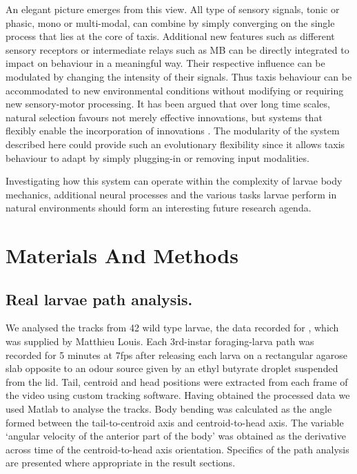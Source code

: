 \documentclass[11pt,a4paper]{article}
\begin{document}
An elegant picture emerges from this view. All type of sensory signals, tonic or phasic, mono or multi-modal, can combine by simply converging on the single process that lies at the core of taxis. Additional new features such as different sensory receptors or intermediate relays such as MB can be directly integrated to impact on behaviour in a meaningful way. Their respective influence can be modulated by changing the intensity of their signals. Thus taxis behaviour can be accommodated to new environmental conditions without modifying or requiring new sensory-motor processing. It has been argued that over long time scales, natural selection favours not merely effective innovations, but systems that flexibly enable the incorporation of innovations \citep{vermeij1973adaptation}. The modularity of the system described here could provide such an evolutionary flexibility since it allows taxis behaviour to adapt by simply plugging-in or removing input modalities.

Investigating how this system can operate within the complexity of larvae body mechanics, additional neural processes and the various tasks larvae perform in natural environments should form an interesting future research agenda.

\section{Materials And Methods}
\subsection{Real larvae path analysis.}
We analysed the tracks from 42 wild type larvae, the data recorded for \cite{gomez2011active}, which was supplied by Matthieu Louis. Each 3rd-instar foraging-larva path was recorded for 5 minutes at 7fps after releasing each larva on a rectangular agarose slab opposite to an odour source given by an ethyl butyrate droplet suspended from the lid.
 Tail, centroid and head positions were extracted from each frame of the video using custom tracking software.
 Having obtained the processed data we used Matlab to analyse the tracks.
  Body bending was calculated as the angle formed between the tail-to-centroid axis and centroid-to-head axis. The variable ‘angular velocity of the anterior part of the body’ was obtained as the derivative across time of the centroid-to-head axis orientation. Specifics of the path analysis are presented where appropriate in the result sections. 
\end{document}

